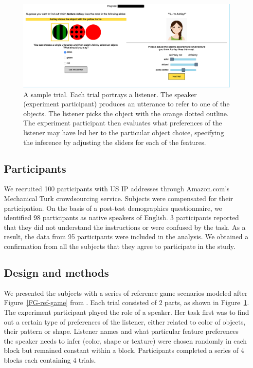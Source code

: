 \documentclass[10pt,a4paper]{article}
\begin{document}
\begin{figure}[ht!]
	\centering
	\includegraphics[width=5.5in]{images/utterance_choice_modification_4.png}
	\caption{ \small{A sample trial. Each trial portrays a listener. The speaker (experiment participant) produces an utterance to refer to one of the objects. The listener picks the object with the orange dotted outline. The experiment participant then evaluates what preferences of the listener may have led her to the particular object choice, specifying the inference by adjusting the sliders for each of the features}.}
	\label{exp1-trial}
\end{figure}

\subsection{Participants}

We recruited 100 participants with US IP addresses through Amazon.com's Mechanical Turk crowdsourcing service. Subjects were compensated for their participation. On the basis of a post-test demographics questionnaire, we identified 98 participants as native speakers of English. 3 participants reported that they did not understand the instructions or were confused by the task. As a result, the data from 95 participants were included in the analysis. We obtained a confirmation from all the subjects that they agree to participate in the study.

\subsection{Design and methods}

We presented the subjects with a series of reference game scenarios modeled after Figure~\ref{FG-ref-game} from .
Each trial consisted of 2 parts, as shown in Figure~\ref{exp1-trial}. The experiment participant played the role of a speaker. Her task first was to find out a certain type of preferences of the listener, either related to color of objects, their pattern or shape. Listener names and what particular feature preferences the speaker needs to infer (color, shape or texture) were chosen randomly in each block but remained constant within a block. Participants completed a series of 4 blocks each containing 4 trials. 
\end{document}
